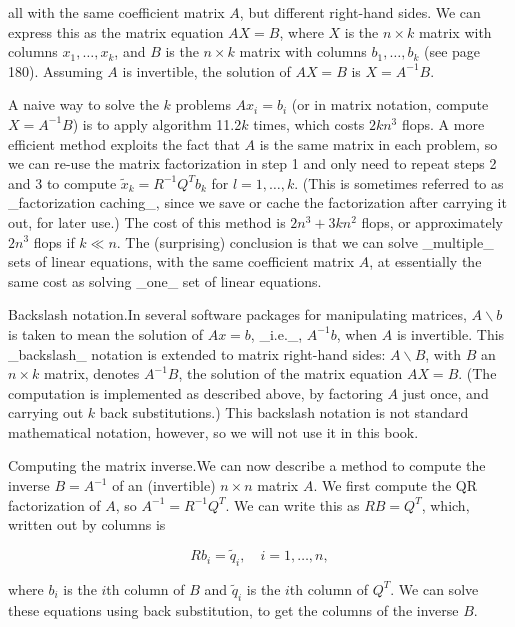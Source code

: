 all with the same coefficient matrix \(A\), but different right-hand sides. We can express this as the matrix equation \(AX=B\), where \(X\) is the \(n\times k\) matrix with columns \(x_{1},\ldots,x_{k}\), and \(B\) is the \(n\times k\) matrix with columns \(b_{1},\ldots,b_{k}\) (see page 180). Assuming \(A\) is invertible, the solution of \(AX=B\) is \(X=A^{-1}B\).

A naive way to solve the \(k\) problems \(Ax_{i}=b_{i}\) (or in matrix notation, compute \(X=A^{-1}B\)) is to apply algorithm 11.2\(k\) times, which costs \(2kn^{3}\) flops. A more efficient method exploits the fact that \(A\) is the same matrix in each problem, so we can re-use the matrix factorization in step 1 and only need to repeat steps 2 and 3 to compute \(\tilde{x}_{k}=R^{-1}Q^{T}b_{k}\) for \(l=1,\ldots,k\). (This is sometimes referred to as _factorization caching_, since we save or cache the factorization after carrying it out, for later use.) The cost of this method is \(2n^{3}+3kn^{2}\) flops, or approximately \(2n^{3}\) flops if \(k\ll n\). The (surprising) conclusion is that we can solve _multiple_ sets of linear equations, with the same coefficient matrix \(A\), at essentially the same cost as solving _one_ set of linear equations.

Backslash notation.In several software packages for manipulating matrices, \(A\backslash b\) is taken to mean the solution of \(Ax=b\), _i.e._, \(A^{-1}b\), when \(A\) is invertible. This _backslash_ notation is extended to matrix right-hand sides: \(A\backslash B\), with \(B\) an \(n\times k\) matrix, denotes \(A^{-1}B\), the solution of the matrix equation \(AX=B\). (The computation is implemented as described above, by factoring \(A\) just once, and carrying out \(k\) back substitutions.) This backslash notation is not standard mathematical notation, however, so we will not use it in this book.

Computing the matrix inverse.We can now describe a method to compute the inverse \(B=A^{-1}\) of an (invertible) \(n\times n\) matrix \(A\). We first compute the QR factorization of \(A\), so \(A^{-1}=R^{-1}Q^{T}\). We can write this as \(RB=Q^{T}\), which, written out by columns is

\[Rb_{i}=\tilde{q}_{i},\quad i=1,\ldots,n,\]

where \(b_{i}\) is the \(i\)th column of \(B\) and \(\tilde{q}_{i}\) is the \(i\)th column of \(Q^{T}\). We can solve these equations using back substitution, to get the columns of the inverse \(B\).


